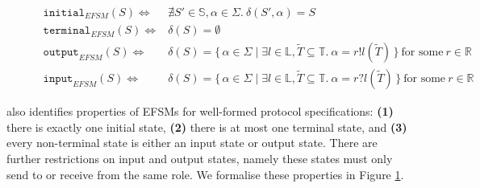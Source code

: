 \begin{figure}[!h]
\doublespacing
\[
\begin{array}{rl}

\texttt{initial}_{EFSM}(S) \iff & \nexists S' \in \mathbb{S},\alpha \in \Sigma.~\delta(S',\alpha) = S \\
\texttt{terminal}_{EFSM}(S) \iff & \delta(S) = \emptyset \\
\texttt{output}_{EFSM}(S) \iff & \delta(S) = \{\,\alpha \in \Sigma \mid \exists l \in \mathbb{L}, \tilde{T} \subseteq{\mathbb{T}}.~\alpha = r!l(\tilde{T})\,\}~\text{for some}~r \in \mathbb{R} \\
\texttt{input}_{EFSM}(S) \iff & \delta(S) = \{\,\alpha \in \Sigma \mid \exists l \in \mathbb{L}, \tilde{T} \subseteq{\mathbb{T}}.~\alpha = r?l(\tilde{T})\,\}~\text{for some}~r \in \mathbb{R}
\end{array}
\]
\singlespacing
{}
\label{fig:efsmstates}
\end{figure}

\cite{Hybrid2016} also identifies properties of EFSMs for well-formed protocol specifications: \textbf{(1)} there is exactly one initial state, \textbf{(2)} there is at most one terminal state, and \textbf{(3)} every non-terminal state is either an input state or output state. There are further restrictions on input and output states, namely these states must only send to or receive from the same role. We formalise these properties in Figure \ref{fig:efsmstates}.

